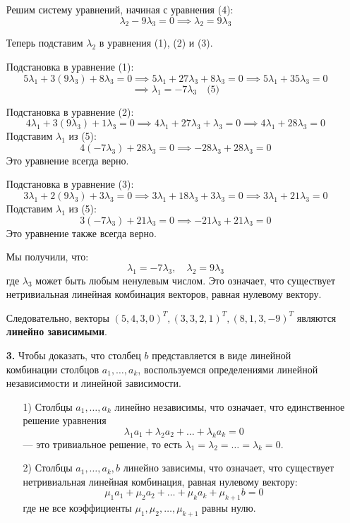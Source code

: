 \documentclass[a4paper]{article}
\begin{document}
\begin{enumerate}
    Решим систему уравнений, начиная с уравнения (4):
    $$
    \lambda_2 - 9\lambda_3 = 0 \implies \lambda_2 = 9\lambda_3
    $$

    Теперь подставим $\lambda_2$ в уравнения (1), (2) и (3).

    Подстановка в уравнение (1):
    $$
    5\lambda_1 + 3(9\lambda_3) + 8\lambda_3 = 0 \implies 5\lambda_1 + 27\lambda_3 + 8\lambda_3 = 0 \implies 5\lambda_1 + 35\lambda_3 = 0
    $$
    $$
    \implies \lambda_1 = -7\lambda_3 \quad \text{(5)}
    $$

    Подстановка в уравнение (2):
    $$
    4\lambda_1 + 3(9\lambda_3) + 1\lambda_3 = 0 \implies 4\lambda_1 + 27\lambda_3 + \lambda_3 = 0 \implies 4\lambda_1 + 28\lambda_3 = 0
    $$
    Подставим $\lambda_1$ из (5):
    $$
    4(-7\lambda_3) + 28\lambda_3 = 0 \implies -28\lambda_3 + 28\lambda_3 = 0
    $$
    Это уравнение всегда верно.

    Подстановка в уравнение (3):
    $$
    3\lambda_1 + 2(9\lambda_3) + 3\lambda_3 = 0 \implies 3\lambda_1 + 18\lambda_3 + 3\lambda_3 = 0 \implies 3\lambda_1 + 21\lambda_3 = 0
    $$
    Подставим $\lambda_1$ из (5):
    $$
    3(-7\lambda_3) + 21\lambda_3 = 0 \implies -21\lambda_3 + 21\lambda_3 = 0
    $$
    Это уравнение также всегда верно.

    Мы получили, что:
    $$
    \lambda_1 = -7\lambda_3, \quad \lambda_2 = 9\lambda_3
    $$
    где $\lambda_3$ может быть любым ненулевым числом. Это означает, что существует нетривиальная линейная комбинация векторов, равная нулевому вектору.

    Следовательно, векторы $(5,4,3,0)^{T}, (3,3,2,1)^{T}, (8,1,3,-9)^{T}$ являются \textbf{линейно зависимыми}.
    
    \item[\textbf{3.}]Чтобы доказать, что столбец $ b $ представляется в виде линейной комбинации столбцов $ a_{1}, \ldots, a_{k} $, воспользуемся определениями линейной независимости и линейной зависимости.
    \begin{enumerate}
        \item[1)]
        Столбцы $ a_{1}, \ldots, a_{k} $ линейно независимы, что означает, что единственное решение уравнения
        $$
        \lambda_1 a_1 + \lambda_2 a_2 + \ldots + \lambda_k a_k = 0
        $$
        — это тривиальное решение, то есть $ \lambda_1 = \lambda_2 = \ldots = \lambda_k = 0 $.\\
        \item[2)]
        Столбцы $ a_{1}, \ldots, a_{k}, b $ линейно зависимы, что означает, что существует нетривиальная линейная комбинация, равная нулевому вектору:
        $$
        \mu_1 a_1 + \mu_2 a_2 + \ldots + \mu_k a_k + \mu_{k+1} b = 0
        $$
        где не все коэффициенты $ \mu_1, \mu_2, \ldots, \mu_{k+1} $ равны нулю.\\
    \end{enumerate}



\end{enumerate}
\end{document}
